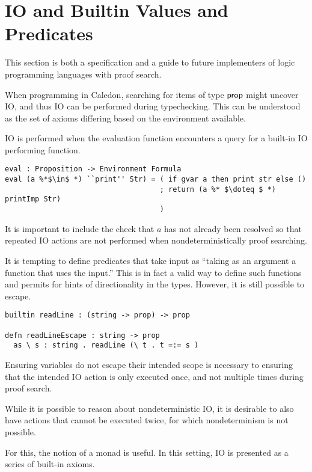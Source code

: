 \section{IO and Builtin Values and Predicates}
 
This section is both a specification and a guide 
to future implementers of logic programming languages with proof search.

When programming in Caledon, searching for items of type $\mathsf{prop}$ 
might uncover IO, and thus IO can be performed during typechecking.  
This can be understood as the set of axioms differing based on the environment available.

IO is performed when the evaluation function encounters a query for a built-in IO performing function.

\begin{lstlisting}
eval : Proposition -> Environment Formula
eval (a %*$\in$ *) ``print'' Str) = ( if gvar a then print str else ()
                                    ; return (a %* $\doteq $ *) printImp Str)
                                    )
\end{lstlisting}

It is important to include the check that $a$ has not already been resolved so that repeated IO actions are not performed
when nondeterministically proof searching.  

It is tempting to define predicates that take input as ``taking as an argument 
a function that uses the input.''  This is in fact a valid way to define such functions 
and permits for hints of directionality in the types.  
However, it is still possible to escape.  

\begin{lstlisting}
builtin readLine : (string -> prop) -> prop

defn readLineEscape : string -> prop
  as \ s : string . readLine (\ t . t =:= s )

\end{lstlisting}

Ensuring variables do not escape their intended scope is necessary to ensuring
that the intended IO action is only executed once, and not multiple times during proof search.

While it is possible to reason about nondeterministic IO, it is desirable to also have actions
that cannot be executed twice, for which nondeterminism is not possible.

For this, the notion of a monad is useful.  
In this setting, IO is presented as a series of built-in axioms.

